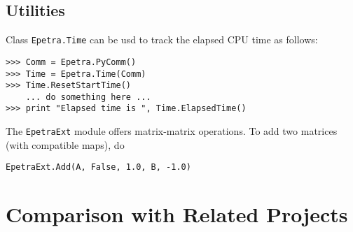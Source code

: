 \documentclass[10pt,relax]{SANDreport}
\begin{document}
\subsection{Utilities}
\label{sec:utilities}

Class {\tt Epetra.Time} can be usd to track the elapsed CPU time as follows:
\begin{verbatim}
>>> Comm = Epetra.PyComm()
>>> Time = Epetra.Time(Comm)
>>> Time.ResetStartTime()
    ... do something here ...
>>> print "Elapsed time is ", Time.ElapsedTime()
\end{verbatim}

The {\tt EpetraExt} module offers matrix-matrix operations. To add two matrices
(with compatible maps), do
\begin{verbatim}
EpetraExt.Add(A, False, 1.0, B, -1.0)
\end{verbatim}

\section{Comparison with Related Projects}
\label{sec:related}
\end{document}
